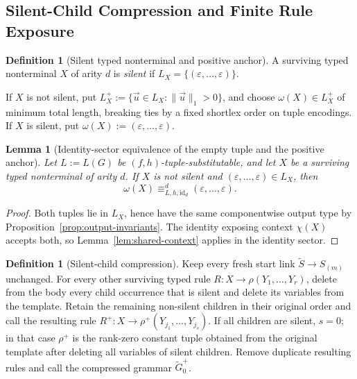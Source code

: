 \documentclass[11pt,a4paper]{article}
\numberwithin{equation}{section}
\theoremstyle{plain}
\newtheorem{lemma}[theorem]{Lemma}
\theoremstyle{definition}
\newtheorem{definition}[theorem]{Definition}
\theoremstyle{remark}
\newcommand{\tuple}[1]{\vec{#1}}
\newcommand{\eps}{\varepsilon}
\begin{document}
\subsection{Silent-Child Compression and Finite Rule Exposure}

\begin{definition}[Silent typed nonterminal and positive anchor]
\label{def:silent-typed}
A surviving typed nonterminal \(X\) of arity \(d\) is \emph{silent} if
\(L_X=\{(\eps,\ldots,\eps)\}\).

If \(X\) is not silent, put
\(L_X^+:=\{\tuple u\in L_X:\|\tuple u\|_1>0\}\), and choose
\(\omega(X)\in L_X^+\) of minimum total length, breaking ties by a fixed
shortlex order on tuple encodings.  If \(X\) is silent, put
\(\omega(X):=(\eps,\ldots,\eps)\).
\end{definition}

\begin{lemma}[Identity-sector equivalence of the empty tuple and the positive anchor]
\label{lem:mixed-empty-positive}
Let \(L:=L(G)\) be \((f,h)\)-tuple-substitutable, and let \(X\) be a
surviving typed nonterminal of arity \(d\).  If \(X\) is not silent and
\((\eps,\ldots,\eps)\in L_X\), then
\[
  \omega(X)\equiv_{L,h,\mathrm{id}_d}^d(\eps,\ldots,\eps).
\]
\end{lemma}

\begin{proof}
Both tuples lie in \(L_X\), hence have the same componentwise output type by
Proposition~\ref{prop:output-invariants}.  The identity exposing context
\(\chi(X)\) accepts both, so Lemma~\ref{lem:shared-context} applies in the
identity sector.
\end{proof}

\begin{definition}[Silent-child compression]
\label{def:silent-compression}
Keep every fresh start link \(\widetilde S\to S_{(m)}\) unchanged.  For every
other surviving typed rule \(R:X\to\rho(Y_1,\ldots,Y_r)\), delete from the
body every child occurrence that is silent and delete its variables from the
template.  Retain the remaining non-silent children in their original order
and call the resulting rule \(R^+:X\to\rho^+(Y_{j_1},\ldots,Y_{j_s})\).
If all children are silent, \(s=0\); in that case \(\rho^+\) is the
rank-zero constant tuple obtained from the original template after deleting
all variables of silent children.  Remove duplicate resulting rules and call
the compressed grammar \(\widetilde G_0^+\).
\end{definition}
\end{document}
